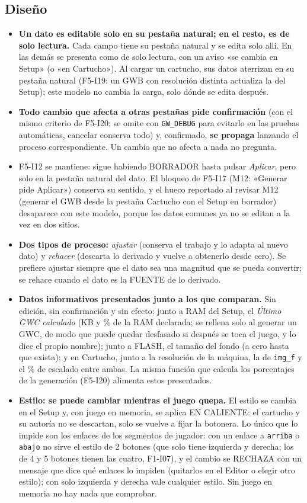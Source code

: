 \subsection{Diseño}
\label{sec:F5I21Diseno}

\begin{itemize}
	\item \textbf{Un dato es editable solo en su pestaña natural; en el resto, es de solo lectura.} Cada campo tiene su pestaña natural y se edita solo allí. En las demás se presenta como de solo lectura, con un aviso «se cambia en  Setup» (o «en Cartucho»). Al cargar un cartucho, sus datos aterrizan en su pestaña natural (F5-I19: un GWB con resolución distinta actualiza la del Setup); este modelo no cambia la carga, solo dónde se edita después.
	\item \textbf{Todo cambio que afecta a otras pestañas pide confirmación} (con el mismo criterio de F5-I20: se omite con \texttt{GW\_DEBUG} para evitarlo en las pruebas automáticas, cancelar conserva todo) y, confirmado, \textbf{se propaga} lanzando el proceso correspondiente. Un cambio que no afecta a nada no pregunta.
	\item F5-I12 se mantiene: sigue habiendo BORRADOR hasta pulsar \emph{Aplicar}, pero solo en la pestaña natural del dato. El bloqueo de F5-I17 (M12: «Generar pide Aplicar») conserva su sentido, y el hueco reportado al revisar M12 (generar el GWB desde la pestaña Cartucho con el Setup en borrador) desaparece con este modelo, porque los datos comunes ya no se editan a la vez en dos sitios.
	\item \textbf{Dos tipos de proceso:} \emph{ajustar} (conserva el trabajo y lo adapta al nuevo dato) y \emph{rehacer} (descarta lo derivado y vuelve a obtenerlo desde cero). Se prefiere ajustar siempre que el dato sea una magnitud que se pueda convertir; se rehace cuando el dato es la FUENTE de lo derivado.
	\item \textbf{Datos informativos presentados junto a los que comparan.} Sin edición, sin confirmación y sin efecto: junto a RAM del Setup, el \emph{Último GWC calculado} (KB y \% de la RAM declarada; se rellena solo al generar un GWC, de modo que puede quedar desfasado si después se toca el juego, y lo dice el propio nombre); junto a FLASH, el tamaño del fondo (a cero hasta que exista); y en Cartucho, junto a la resolución de la máquina, la de \texttt{img\_f} y el \% de escalado entre ambas. La misma función que calcula los porcentajes de la generación (F5-I20) alimenta estos presentados.
	\item \textbf{Estilo: se puede cambiar mientras el juego quepa.} El estilo se cambia en el Setup y, con juego en memoria, se aplica EN CALIENTE: el cartucho y su autoría no se descartan, solo se vuelve a fijar la botonera. Lo único que lo impide son los enlaces de los segmentos de jugador: con un enlace a \texttt{arriba} o \texttt{abajo} no sirve el estilo de 2 botones (que solo tiene izquierda y derecha; los de 4 y 5 botones tienen las cuatro, F1-I07), y el cambio se RECHAZA con un mensaje que dice qué enlaces lo impiden (quitarlos en el Editor o elegir otro estilo); con solo izquierda y derecha vale cualquier estilo. Sin juego en memoria no hay nada que comprobar.

\end{itemize}
